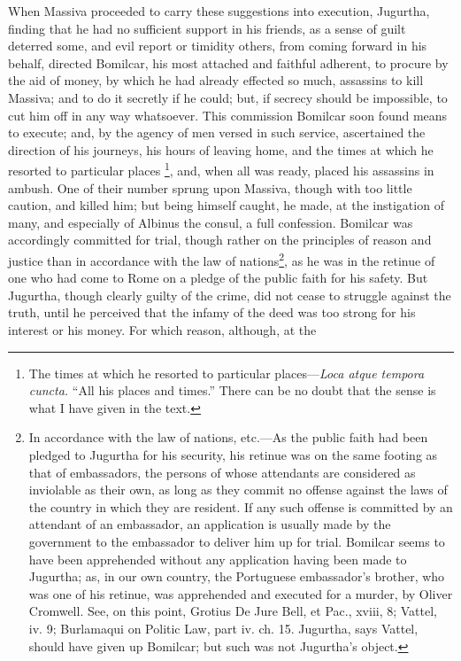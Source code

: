 When Massiva proceeded to carry these suggestions into execution,
Jugurtha, finding that he had no sufficient support in his friends, as
a sense of guilt deterred some, and evil report or timidity others,
from coming forward in his behalf, directed Bomilcar, his most
attached and faithful adherent, to procure by the aid of money, by
which he had already effected so much, assassins to kill Massiva; and
to do it secretly if he could; but, if secrecy should be impossible,
to cut him off in any way whatsoever. This commission Bomilcar soon
found means to execute; and, by the agency of men versed in such
service, ascertained the direction of his journeys, his hours of
leaving home, and the times at which he resorted to particular places
\footnote{The times at which he resorted to particular places—\emph{Loca
atque tempora cuncta.} ``All his places and times.'' There can be no
doubt that the sense is what I have given in the text.}, and, when all was ready, placed his assassins in ambush. One of
their number sprung upon Massiva, though with too little caution, and
killed him; but being himself caught, he made, at the instigation of
many, and especially of Albinus the consul, a full confession.
Bomilcar was accordingly committed for trial, though rather on the
principles of reason and justice than in accordance with the law of
nations\footnote{In accordance with the law of nations, etc.—As the public faith
had been pledged to Jugurtha for his security, his retinue was on the
same footing as that of embassadors, the persons of whose attendants
are considered as inviolable as their own, as long as they commit no
offense against the laws of the country in which they are resident. If
any such offense is committed by an attendant of an embassador, an
application is usually made by the government to the embassador to
deliver him up for trial. Bomilcar seems to have been apprehended
without any application having been made to Jugurtha; as, in our own
country, the Portuguese embassador's brother, who was one of his
retinue, was apprehended and executed for a murder, by Oliver
Cromwell. See, on this point, Grotius De Jure Bell, et Pac., xviii, 8;
Vattel, iv. 9; Burlamaqui on Politic Law, part iv. ch. 15. Jugurtha,
says Vattel, should have given up Bomilcar; but such was not
Jugurtha's object.}, as he was in the retinue of one who had come to Rome on
a pledge of the public faith for his safety. But Jugurtha, though
clearly guilty of the crime, did not cease to struggle against the
truth, until he perceived that the infamy of the deed was too strong
for his interest or his money. For which reason, although, at the
